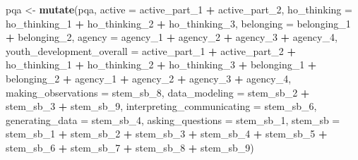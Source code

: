 \documentclass[]{book}
\newenvironment{Shaded}{\begin{snugshade}}{\end{snugshade}}
\newcommand{\KeywordTok}[1]{\textcolor[rgb]{0.13,0.29,0.53}{\textbf{#1}}}
\newcommand{\DataTypeTok}[1]{\textcolor[rgb]{0.13,0.29,0.53}{#1}}
\newcommand{\DecValTok}[1]{\textcolor[rgb]{0.00,0.00,0.81}{#1}}
\newcommand{\StringTok}[1]{\textcolor[rgb]{0.31,0.60,0.02}{#1}}
\newcommand{\OperatorTok}[1]{\textcolor[rgb]{0.81,0.36,0.00}{\textbf{#1}}}
\newcommand{\NormalTok}[1]{#1}
\begin{document}
\begin{Shaded}
\begin{Highlighting}[]
\NormalTok{pqa <-}\StringTok{ }\KeywordTok{mutate}\NormalTok{(pqa, }
              \DataTypeTok{active =}\NormalTok{ active_part_}\DecValTok{1} \OperatorTok{+}\StringTok{ }\NormalTok{active_part_}\DecValTok{2}\NormalTok{,}
              \DataTypeTok{ho_thinking =}\NormalTok{ ho_thinking_}\DecValTok{1} \OperatorTok{+}\StringTok{ }\NormalTok{ho_thinking_}\DecValTok{2} \OperatorTok{+}\StringTok{ }\NormalTok{ho_thinking_}\DecValTok{3}\NormalTok{,}
              \DataTypeTok{belonging =}\NormalTok{ belonging_}\DecValTok{1} \OperatorTok{+}\StringTok{ }\NormalTok{belonging_}\DecValTok{2}\NormalTok{,}
              \DataTypeTok{agency =}\NormalTok{ agency_}\DecValTok{1} \OperatorTok{+}\StringTok{ }\NormalTok{agency_}\DecValTok{2} \OperatorTok{+}\StringTok{ }\NormalTok{agency_}\DecValTok{3} \OperatorTok{+}\StringTok{ }\NormalTok{agency_}\DecValTok{4}\NormalTok{,}
              \DataTypeTok{youth_development_overall =}\NormalTok{ active_part_}\DecValTok{1} \OperatorTok{+}\StringTok{ }\NormalTok{active_part_}\DecValTok{2} \OperatorTok{+}\StringTok{ }\NormalTok{ho_thinking_}\DecValTok{1} \OperatorTok{+}\StringTok{ }\NormalTok{ho_thinking_}\DecValTok{2} \OperatorTok{+}\StringTok{ }\NormalTok{ho_thinking_}\DecValTok{3} \OperatorTok{+}\StringTok{ }\NormalTok{belonging_}\DecValTok{1} \OperatorTok{+}\StringTok{ }\NormalTok{belonging_}\DecValTok{2} \OperatorTok{+}\StringTok{ }\NormalTok{agency_}\DecValTok{1} \OperatorTok{+}\StringTok{ }\NormalTok{agency_}\DecValTok{2} \OperatorTok{+}\StringTok{ }\NormalTok{agency_}\DecValTok{3} \OperatorTok{+}\StringTok{ }\NormalTok{agency_}\DecValTok{4}\NormalTok{,}
              \DataTypeTok{making_observations =}\NormalTok{ stem_sb_}\DecValTok{8}\NormalTok{,}
              \DataTypeTok{data_modeling =}\NormalTok{ stem_sb_}\DecValTok{2} \OperatorTok{+}\StringTok{ }\NormalTok{stem_sb_}\DecValTok{3} \OperatorTok{+}\StringTok{ }\NormalTok{stem_sb_}\DecValTok{9}\NormalTok{,}
              \DataTypeTok{interpreting_communicating =}\NormalTok{ stem_sb_}\DecValTok{6}\NormalTok{,}
              \DataTypeTok{generating_data =}\NormalTok{ stem_sb_}\DecValTok{4}\NormalTok{,}
              \DataTypeTok{asking_questions =}\NormalTok{ stem_sb_}\DecValTok{1}\NormalTok{,}
              \DataTypeTok{stem_sb =}\NormalTok{ stem_sb_}\DecValTok{1} \OperatorTok{+}\StringTok{ }\NormalTok{stem_sb_}\DecValTok{2} \OperatorTok{+}\StringTok{ }\NormalTok{stem_sb_}\DecValTok{3} \OperatorTok{+}\StringTok{ }\NormalTok{stem_sb_}\DecValTok{4} \OperatorTok{+}\StringTok{ }\NormalTok{stem_sb_}\DecValTok{5} \OperatorTok{+}\StringTok{ }\NormalTok{stem_sb_}\DecValTok{6} \OperatorTok{+}\StringTok{ }\NormalTok{stem_sb_}\DecValTok{7} \OperatorTok{+}\StringTok{ }\NormalTok{stem_sb_}\DecValTok{8} \OperatorTok{+}\StringTok{ }\NormalTok{stem_sb_}\DecValTok{9}\NormalTok{)}


\end{Highlighting}
\end{Shaded}
\end{document}
